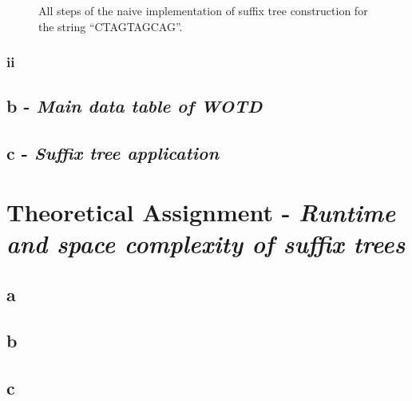 \documentclass[%
   10pt,              %
   ngerman,           %
   a4paper,           %
   DIV11,             %
]{scrartcl}%
\begin{document}
\begin{figure}[ht]
{ }
 \caption{All steps of the naive implementation of suffix tree construction for the string ``CTAGTAGCAG''.}
 \label{fig:naiveImpl}
\end{figure}

\subsubsection*{ii}


\subsection*{b - \textit{Main data table of WOTD}}


\subsection*{c - \textit{Suffix tree application}}



\section*{Theoretical Assignment - \textit{Runtime and space complexity of suffix trees}}

\subsection*{a}


\subsection*{b}


\subsection*{c}
\end{document}
